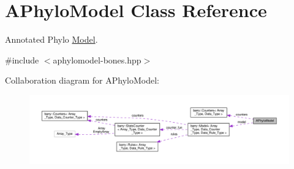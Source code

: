\hypertarget{class_a_phylo_model}{}\section{A\+Phylo\+Model Class Reference}
\label{class_a_phylo_model}


Annotated Phylo \hyperlink{class_model}{Model}.  




{\ttfamily \#include $<$aphylomodel-\/bones.\+hpp$>$}



Collaboration diagram for A\+Phylo\+Model\+:
\nopagebreak
\begin{figure}[H]
\begin{center}
\leavevmode
\includegraphics[width=350pt]{class_a_phylo_model__coll__graph}
\end{center}
\end{figure}
